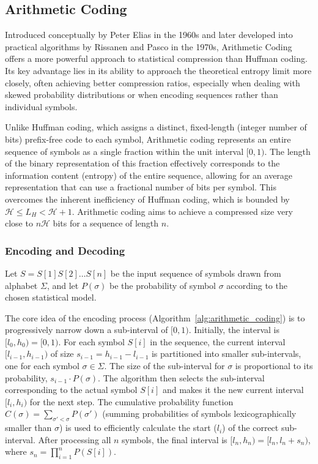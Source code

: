 \subsection{Arithmetic Coding} \label{subsec:arithmetic_coding}

Introduced conceptually by Peter Elias in the 1960s and later developed into practical algorithms by Rissanen \cite{rissanen1976generalized} and Pasco \cite{pasco1976source} in the 1970s, Arithmetic Coding offers a more powerful approach to statistical compression than Huffman coding. Its key advantage lies in its ability to approach the theoretical entropy limit more closely, often achieving better compression ratios, especially when dealing with skewed probability distributions or when encoding sequences rather than individual symbols.

Unlike Huffman coding, which assigns a distinct, fixed-length (integer number of bits) prefix-free code to each symbol, Arithmetic coding represents an entire sequence of symbols as a single fraction within the unit interval $[0, 1)$. The length of the binary representation of this fraction effectively corresponds to the information content (entropy) of the entire sequence, allowing for an average representation that can use a fractional number of bits per symbol. This overcomes the inherent inefficiency of Huffman coding, which is bounded by $\mathcal{H} \le L_H < \mathcal{H} + 1$. Arithmetic coding aims to achieve a compressed size very close to $n\mathcal{H}$ bits for a sequence of length $n$.

\subsubsection{Encoding and Decoding}
Let $S = S[1]S[2]\ldots S[n]$ be the input sequence of symbols drawn from alphabet $\Sigma$, and let $P(\sigma)$ be the probability of symbol $\sigma$ according to the chosen statistical model.

The core idea of the encoding process (Algorithm~\ref{alg:arithmetic_coding}) is to progressively narrow down a sub-interval of $[0, 1)$. Initially, the interval is $[l_0, h_0) = [0, 1)$. For each symbol $S[i]$ in the sequence, the current interval $[l_{i-1}, h_{i-1})$ of size $s_{i-1} = h_{i-1} - l_{i-1}$ is partitioned into smaller sub-intervals, one for each symbol $\sigma \in \Sigma$. The size of the sub-interval for $\sigma$ is proportional to its probability, $s_{i-1} \cdot P(\sigma)$. The algorithm then selects the sub-interval corresponding to the actual symbol $S[i]$ and makes it the new current interval $[l_i, h_i)$ for the next step. The cumulative probability function $C(\sigma) = \sum_{\sigma' < \sigma} P(\sigma')$ (summing probabilities of symbols lexicographically smaller than $\sigma$) is used to efficiently calculate the start ($l_i$) of the correct sub-interval. After processing all $n$ symbols, the final interval is $[l_n, h_n) = [l_n, l_n + s_n)$, where $s_n = \prod_{i=1}^n P(S[i])$.

